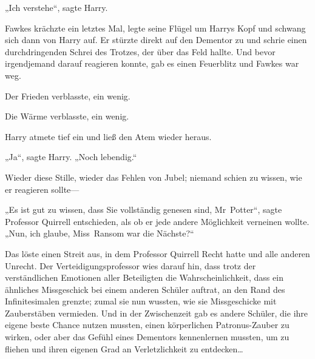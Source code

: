 „Ich verstehe“, sagte Harry.

Fawkes krächzte ein letztes Mal, legte seine Flügel um Harrys Kopf und schwang sich dann von Harry auf. Er stürzte direkt auf den Dementor zu und schrie einen durchdringenden Schrei des Trotzes, der über das Feld hallte. Und bevor irgendjemand darauf reagieren konnte, gab es einen Feuerblitz und Fawkes war weg.

Der Frieden verblasste, ein wenig.

Die Wärme verblasste, ein wenig.

Harry atmete tief ein und ließ den Atem wieder heraus.

„Ja“, sagte Harry. „Noch lebendig.“

Wieder diese Stille, wieder das Fehlen von Jubel; niemand schien zu wissen, wie er reagieren sollte—

„Es ist gut zu wissen, dass Sie vollständig genesen sind, Mr~Potter“, sagte Professor Quirrell entschieden, als ob er jede andere Möglichkeit verneinen wollte. „Nun, ich glaube, Miss~Ransom war die Nächste?“

Das löste einen Streit aus, in dem Professor Quirrell Recht hatte und alle anderen Unrecht. Der Verteidigungsprofessor wies darauf hin, dass trotz der verständlichen Emotionen aller Beteiligten die Wahrscheinlichkeit, dass ein ähnliches Missgeschick bei einem anderen Schüler auftrat, an den Rand des Infinitesimalen grenzte; zumal sie nun wussten, wie sie Missgeschicke mit Zauberstäben vermieden. Und in der Zwischenzeit gab es andere Schüler, die ihre eigene beste Chance nutzen mussten, einen körperlichen Patronus-Zauber zu wirken, oder aber das Gefühl eines Dementors kennenlernen mussten, um zu fliehen und ihren eigenen Grad an Verletzlichkeit zu entdecken…

